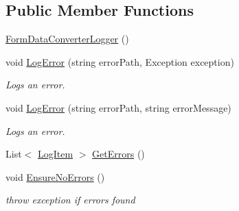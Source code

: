 \subsection*{Public Member Functions}
\begin{DoxyCompactItemize}
\item 
\hyperlink{classCqrs_1_1WebApi_1_1Formatters_1_1FormMultipart_1_1Infrastructure_1_1Logger_1_1FormDataConverterLogger_a232c53d2c78cab6b419a37306d64c74b_a232c53d2c78cab6b419a37306d64c74b}{Form\+Data\+Converter\+Logger} ()
\item 
void \hyperlink{classCqrs_1_1WebApi_1_1Formatters_1_1FormMultipart_1_1Infrastructure_1_1Logger_1_1FormDataConverterLogger_ab54b4f24cc7ee7eacddbb9900a832ca3_ab54b4f24cc7ee7eacddbb9900a832ca3}{Log\+Error} (string error\+Path, Exception exception)
\begin{DoxyCompactList}\small\item\em Logs an error. \end{DoxyCompactList}\item 
void \hyperlink{classCqrs_1_1WebApi_1_1Formatters_1_1FormMultipart_1_1Infrastructure_1_1Logger_1_1FormDataConverterLogger_a72fcac7560a05dfebbff772a4216a5d8_a72fcac7560a05dfebbff772a4216a5d8}{Log\+Error} (string error\+Path, string error\+Message)
\begin{DoxyCompactList}\small\item\em Logs an error. \end{DoxyCompactList}\item 
List$<$ \hyperlink{classCqrs_1_1WebApi_1_1Formatters_1_1FormMultipart_1_1Infrastructure_1_1Logger_1_1FormDataConverterLogger_1_1LogItem}{Log\+Item} $>$ \hyperlink{classCqrs_1_1WebApi_1_1Formatters_1_1FormMultipart_1_1Infrastructure_1_1Logger_1_1FormDataConverterLogger_a5cdd85325e839d1238b0384fba15f595_a5cdd85325e839d1238b0384fba15f595}{Get\+Errors} ()
\item 
void \hyperlink{classCqrs_1_1WebApi_1_1Formatters_1_1FormMultipart_1_1Infrastructure_1_1Logger_1_1FormDataConverterLogger_a8e3cd3f8d5e7b3d2b24b67b2ce3e69df_a8e3cd3f8d5e7b3d2b24b67b2ce3e69df}{Ensure\+No\+Errors} ()
\begin{DoxyCompactList}\small\item\em throw exception if errors found \end{DoxyCompactList}\end{DoxyCompactItemize}


